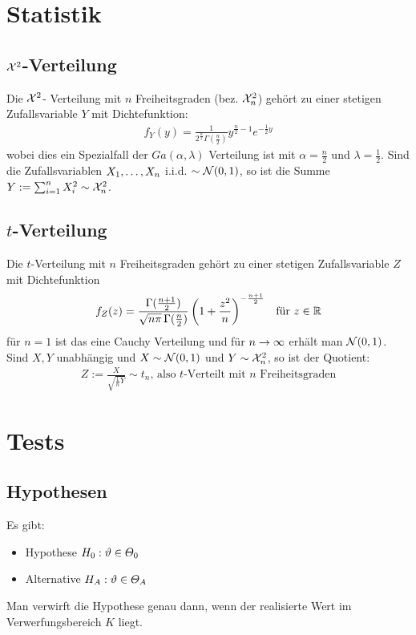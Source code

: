 \section{Statistik}
\subsection{$\mathcal{X}^2$-Verteilung}
Die $\mathcal{X}^2$- Verteilung mit $n$ Freiheitsgraden (bez. $\mathcal{X}^2_n$) gehört zu einer
stetigen Zufallsvariable $Y$ mit Dichtefunktion:
\begin{align*}
  f_Y (y) = \frac{1}{2^{\frac{n}{2}}  \Gamma (\frac{n}{2})} y^{\frac{n}{2} - 1} e^{-\frac{1}{2} y}
\end{align*}
wobei dies ein Spezialfall der $Ga (\alpha, \lambda)$ Verteilung ist mit
$\alpha = \frac{n}{2}$ und $\lambda = \frac{1}{2}$. Sind die Zufallsvariablen
$X_1, \dots, X_n$ i.i.d. $\sim \mathcal{N} (0, 1)$, so ist die Summe
$Y := \sum_{i = 1}^n X_i^2 \sim \mathcal{X}^2_n$.
\subsection{$t$-Verteilung}
Die $t$-Verteilung mit $n$ Freiheitsgraden gehört zu einer stetigen
Zufallsvariable $Z$ mit Dichtefunktion
\begin{align*}
  f_Z (z) = \frac{\Gamma (\frac{n+1}{2})}{\sqrt{n \pi} \, \Gamma (\frac{n}{2})} \left( 1 + \frac{z^2}{n} \right)^{-\frac{n+1}{2}}
   &  & \text{für } z \in \mathbb{R}
\end{align*}
für $n = 1$ ist das eine Cauchy Verteilung und für $n \rightarrow \infty$ erhält man
$\mathcal{N} (0, 1)$. Sind $X, Y$ unabhängig und $X \sim \mathcal{N} (0, 1)$
und $Y \sim \mathcal{X}^2_n$, so ist der Quotient:
\begin{align*}
  Z := \frac{X}{\sqrt{\frac{1}{n} Y}} \sim t_n \text{, also $t$-Verteilt mit $n$ Freiheitsgraden}
\end{align*}
\section{Tests}
\subsection{Hypothesen}
Es gibt:
\begin{itemize}
  \item Hypothese $H_0 : \vartheta \in \varTheta_0$
  \item Alternative $H_A : \vartheta \in \varTheta_A$
\end{itemize}
Man verwirft die Hypothese genau dann, wenn der realisierte Wert im
Verwerfungsbereich $K$ liegt.
